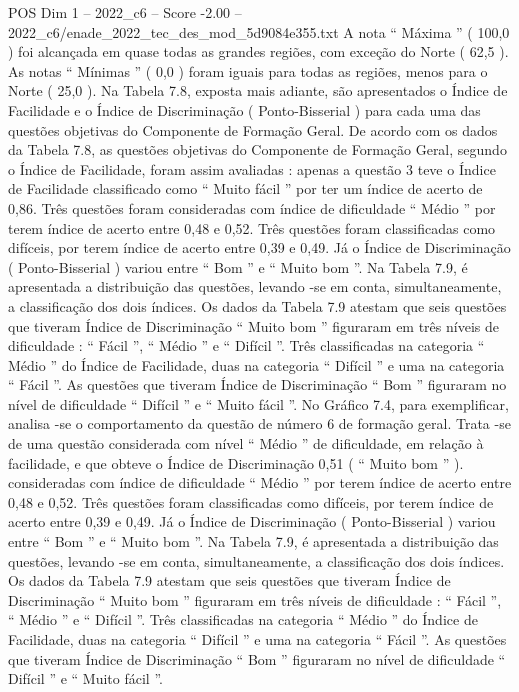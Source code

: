 \begin{textsample}{POS Dim 1 – 2022\_c6 – Score -2.00 – 2022\_c6/enade\_2022\_tec\_des\_mod\_5d9084e355.txt}
A nota “ Máxima ” ( 100,0 ) foi alcançada em quase todas as grandes regiões, com exceção do Norte ( 62,5 ).
As notas “ Mínimas ” ( 0,0 ) foram iguais para todas as regiões, menos para o Norte ( 25,0 ).
Na Tabela 7.8, exposta mais adiante, são apresentados o Índice de Facilidade e o Índice de Discriminação ( Ponto-Bisserial ) para cada uma das questões objetivas do Componente de Formação Geral.
De acordo com os dados da Tabela 7.8, as questões objetivas do Componente de Formação Geral, segundo o Índice de Facilidade, foram assim avaliadas : apenas a questão 3 teve o Índice de Facilidade classificado como “ Muito fácil ” por ter um índice de acerto de 0,86.
Três questões foram consideradas com índice de dificuldade “ Médio ” por terem índice de acerto entre 0,48 e 0,52.
Três questões foram classificadas como difíceis, por terem índice de acerto entre 0,39 e 0,49.
Já o Índice de Discriminação ( Ponto-Bisserial ) variou entre “ Bom ” e “ Muito bom ”.
Na Tabela 7.9, é apresentada a distribuição das questões, levando -se em conta, simultaneamente, a classificação dos dois índices.
Os dados da Tabela 7.9 atestam que seis questões que tiveram Índice de Discriminação “ Muito bom ” figuraram em três níveis de dificuldade : “ Fácil ”, “ Médio ” e “ Difícil ”.
Três classificadas na categoria “ Médio ” do Índice de Facilidade, duas na categoria “ Difícil ” e uma na categoria “ Fácil ”.
As questões que tiveram Índice de Discriminação “ Bom ” figuraram no nível de dificuldade “ Difícil ” e “ Muito fácil ”.
No Gráfico 7.4, para exemplificar, analisa -se o comportamento da questão de número 6 de formação geral.
Trata -se de uma questão considerada com nível “ Médio ” de dificuldade, em relação à facilidade, e que obteve o Índice de Discriminação 0,51 ( “ Muito bom ” ). consideradas com índice de dificuldade “ Médio ” por terem índice de acerto entre 0,48 e 0,52.
Três questões foram classificadas como difíceis, por terem índice de acerto entre 0,39 e 0,49.
Já o Índice de Discriminação ( Ponto-Bisserial ) variou entre “ Bom ” e “ Muito bom ”.
Na Tabela 7.9, é apresentada a distribuição das questões, levando -se em conta, simultaneamente, a classificação dos dois índices.
Os dados da Tabela 7.9 atestam que seis questões que tiveram Índice de Discriminação “ Muito bom ” figuraram em três níveis de dificuldade : “ Fácil ”, “ Médio ” e “ Difícil ”.
Três classificadas na categoria “ Médio ” do Índice de Facilidade, duas na categoria “ Difícil ” e uma na categoria “ Fácil ”.
As questões que tiveram Índice de Discriminação “ Bom ” figuraram no nível de dificuldade “ Difícil ” e “ Muito fácil ”.

\end{textsample}
